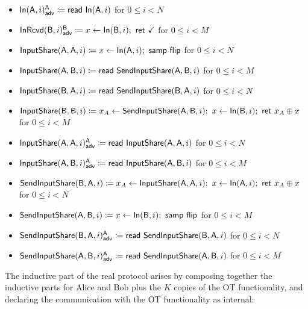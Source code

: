 \begin{itemize}
\item {\color{blue} $\mathsf{In}(\mathsf{A},i)^{\mathsf{A}}_{\mathsf{adv}} \coloneqq \mathsf{read} \ \mathsf{In}(\mathsf{A},i)$ for $0 \leq i < N$}
\item {\color{blue} $\mathsf{InRcvd}(\mathsf{B},i)^{\mathsf{B}}_{\mathsf{adv}} \coloneqq x \leftarrow \mathsf{In}(\mathsf{B},i); \ \mathsf{ret} \ \checkmark$ for $0 \leq i < M$}\smallskip
\item $\mathsf{InputShare}(\mathsf{A},\mathsf{A},i) \coloneqq x \leftarrow \mathsf{In}(\mathsf{A},i); \ \mathsf{samp} \ \mathsf{flip}$ for $0 \leq i < N$
\item $\mathsf{InputShare}(\mathsf{A},\mathsf{B},i) \coloneqq \mathsf{read} \ \mathsf{SendInputShare}(\mathsf{A},\mathsf{B},i)$ for $0 \leq i < M$
\item $\mathsf{InputShare}(\mathsf{B},\mathsf{A},i) \coloneqq \mathsf{read} \ \mathsf{SendInputShare}(\mathsf{B},\mathsf{A},i)$ for $0 \leq i < N$
\item $\InputShare(\B,\B,i) \coloneqq x_A \leftarrow \SendInputShare(\A,\B,i); \ x \leftarrow \In(\B,i); \ \ret{x_A \oplus x}$ for $0 \leq i < M$\smallskip
\item {\color{blue} $\mathsf{InputShare}(\mathsf{A},\mathsf{A},i)^{\mathsf{A}}_{\mathsf{adv}} \coloneqq \mathsf{read} \ \mathsf{InputShare}(\mathsf{A},\mathsf{A},i)$ for $0 \leq i < N$}
\item {\color{blue} $\mathsf{InputShare}(\mathsf{A},\mathsf{B},i)^{\mathsf{A}}_{\mathsf{adv}} \coloneqq \mathsf{read} \ \mathsf{InputShare}(\mathsf{A},\mathsf{B},i)$ for $0 \leq i < M$}\smallskip
\item $\mathsf{SendInputShare}(\mathsf{B},\mathsf{A},i) \coloneqq x_A \leftarrow \mathsf{InputShare}(\mathsf{A},\mathsf{A},i); \ x \leftarrow \mathsf{In}(\mathsf{A},i); \ \mathsf{ret} \ x_A \oplus x$ for $0 \leq i < N$
\item $\mathsf{SendInputShare}(\mathsf{A},\mathsf{B},i) \coloneqq x \leftarrow \mathsf{In}(\mathsf{B},i); \ \mathsf{samp} \ \mathsf{flip}$ for $0 \leq i < M$\smallskip
\item {\color{blue} $\mathsf{SendInputShare}(\mathsf{B},\mathsf{A},i)^{\mathsf{A}}_{\mathsf{adv}} \coloneqq \mathsf{read} \ \mathsf{SendInputShare}(\mathsf{B},\mathsf{A},i)$ for $0 \leq i < N$}
\item {\color{blue} $\mathsf{SendInputShare}(\mathsf{A},\mathsf{B},i)^{\mathsf{A}}_{\mathsf{adv}} \coloneqq \mathsf{read} \ \mathsf{SendInputShare}(\mathsf{A},\mathsf{B},i)$ for $0 \leq i < M$}
\end{itemize}

\noindent The inductive part of the real protocol arises by composing together the inductive parts for Alice and Bob plus the $K$ copies of the OT functionality, and declaring the communication with the OT functionality as internal:

